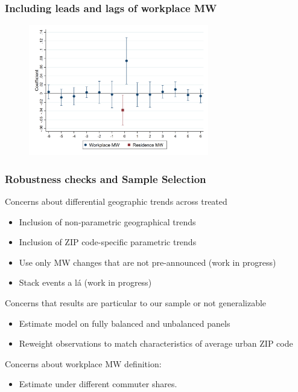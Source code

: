 \documentclass[aspectratio=169, t]{beamer}
\begin{document}
\begin{frame}[label = dyn_baseline_plot]
	\frametitle{Including leads and lags of workplace MW}

	\begin{figure}
		\centering
		\vspace{-2mm}
		\includegraphics[width=0.70\textwidth]{fd_baseline/output/fd_baseline_exp_ln_mw_17_dynamic.png}
	\end{figure}

	\hyperlink{dynamic_mw}{}
	\hyperlink{fd_both_dynamic}{}

	
\end{frame}

\begin{frame}[label = robus_sample]
	\frametitle{Robustness checks and Sample Selection}

	Concerns about differential geographic trends across treated
	\begin{itemize}
		\item Inclusion of non-parametric geographical trends
		\item Inclusion of ZIP code-specific parametric trends
		\item Use only MW changes that are not pre-announced (work in progress)
		\item Stack events a lá \cite{CegnizEtAl2019} (work in progress)
	\end{itemize}
	\hyperlink{robustness_geo}{}

	\vspace{3mm}
	Concerns that results are particular to our sample or not generalizable
	\begin{itemize}
		\item Estimate model on fully balanced and unbalanced panels
		\item Reweight observations to match characteristics of average urban ZIP code
	\end{itemize}
	\hyperlink{robustness_geo}{}
	
	\vspace{3mm}
	Concerns about workplace MW definition:
	\begin{itemize}
		\item Estimate under different commuter shares.
	\end{itemize}
	\hyperlink{robustness_exp_mw}{}
\end{frame}
\end{document}
